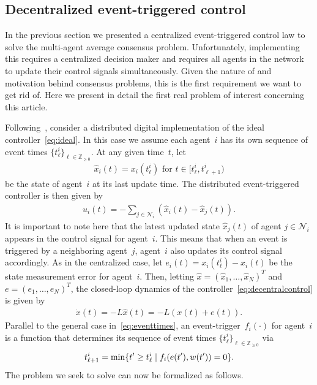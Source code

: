 \documentclass{autart}
\newcommand{\integernonnegative}{\mathbb{Z}_{\ge 0}}
\newcommand{\NN}{{\mathcal{N}}}
\renewcommand{\hat}{\widehat}
\begin{document}
\subsection{Decentralized event-triggered control}\label{se:canonical}

In the previous section we presented a centralized event-triggered
control law to solve the multi-agent average consensus
problem. Unfortunately, implementing this requires a centralized
decision maker and requires all agents in the network to update their
control signals simultaneously. Given the nature of and motivation
behind consensus problems, this is the first requirement we want to
get rid of. Here we present in detail the first real problem of
interest concerning this article.

Following~\citep{DVD-EF-KHJ:12}, consider a distributed digital
implementation of the ideal controller~\eqref{eq:ideal}. In this case
we assume each agent~$i$ has its own sequence of event times
$\{ t_\ell^i \}_{\ell \in \integernonnegative}$.  At any given
time~$t$, let
\begin{align}
  \hat{x}_i(t) = x_i(t_\ell^i) \text{ for } t \in [t_\ell^i, t_{\ell+1}^i )
\end{align} 
be the state of agent~$i$ at its last update time. The distributed
event-triggered controller is then given by
\begin{align}\label{eq:decentralcontrol}
  u_i(t) = - \sum_{j \in \NN_i} (\hat{x}_i(t) - \hat{x}_j(t) ) .
\end{align}
It is important to note here that the latest updated state
$\hat{x}_j(t)$ of agent $j \in \NN_i$ appears in the control signal
for agent~$i$. This means that when an event is triggered by a
neighboring agent~$j$, agent~$i$ also updates its control signal
accordingly.  As in the centralized case, let
$e_i(t) = x_i(t_\ell^i) - x_i(t)$ be the state measurement error for
agent~$i$. Then, letting $\hat{x} = (\hat{x}_1, \dots, \hat{x}_N)^T$
and $e = (e_1, \dots, e_N)^T$, the closed-loop dynamics of the
controller~\eqref{eq:decentralcontrol} is given by
\begin{align}\label{eq:decentraldynamics} 
  \dot{x}(t) = - L \hat{x}(t) = - L ( x(t) + e(t) ).
\end{align}
{Parallel to the general case in~\eqref{eq:eventtimes}, an
  event-trigger~$f_i(\cdot)$ for agent~$i$ is a function that
  determines its sequence of event times $\{ t_\ell^i \}_{\ell \in
    \integernonnegative}$ via
\begin{align}\label{eq:eventtimes-decentralized}
  t_{\ell+1}^i = \min \{ t' \geq t_\ell^i \hspace*{1mm} | \hspace*{1mm}
  f_i(e(t'),w(t')) = 0 \} .
\end{align}
 The problem we seek to solve can now be formalized as follows.}
\end{document}
